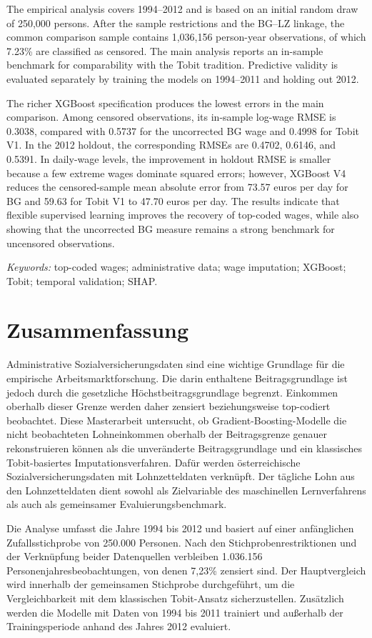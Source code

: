 \documentclass[12pt,a4paper,oneside,titlepage]{book}
\begin{document}
The empirical analysis covers 1994--2012 and is based on an initial random draw of 250,000 persons. After the sample restrictions and the BG--LZ linkage, the common comparison sample contains 1,036,156 person-year observations, of which 7.23\% are classified as censored. The main analysis reports an in-sample benchmark for comparability with the Tobit tradition. Predictive validity is evaluated separately by training the models on 1994--2011 and holding out 2012.

The richer XGBoost specification produces the lowest errors in the main comparison. Among censored observations, its in-sample log-wage RMSE is 0.3038, compared with 0.5737 for the uncorrected BG wage and 0.4998 for Tobit V1. In the 2012 holdout, the corresponding RMSEs are 0.4702, 0.6146, and 0.5391. In daily-wage levels, the improvement in holdout RMSE is smaller because a few extreme wages dominate squared errors; however, XGBoost V4 reduces the censored-sample mean absolute error from 73.57 euros per day for BG and 59.63 for Tobit V1 to 47.70 euros per day. The results indicate that flexible supervised learning improves the recovery of top-coded wages, while also showing that the uncorrected BG measure remains a strong benchmark for uncensored observations.

\textit{Keywords:} top-coded wages; administrative data; wage imputation; XGBoost; Tobit; temporal validation; SHAP.

\chapter*{Zusammenfassung}
Administrative Sozialversicherungsdaten sind eine wichtige Grundlage für die empirische Arbeitsmarktforschung. Die darin enthaltene Beitragsgrundlage ist jedoch durch die gesetzliche Höchstbeitragsgrundlage begrenzt. Einkommen oberhalb dieser Grenze werden daher zensiert beziehungsweise top-codiert beobachtet. Diese Masterarbeit untersucht, ob Gradient-Boosting-Modelle die nicht beobachteten Lohneinkommen oberhalb der Beitragsgrenze genauer rekonstruieren können als die unveränderte Beitragsgrundlage und ein klassisches Tobit-basiertes Imputationsverfahren. Dafür werden österreichische Sozialversicherungsdaten mit Lohnzetteldaten verknüpft. Der tägliche Lohn aus den Lohnzetteldaten dient sowohl als Zielvariable des maschinellen Lernverfahrens als auch als gemeinsamer Evaluierungsbenchmark.

Die Analyse umfasst die Jahre 1994 bis 2012 und basiert auf einer anfänglichen Zufallsstichprobe von 250.000 Personen. Nach den Stichprobenrestriktionen und der Verknüpfung beider Datenquellen verbleiben 1.036.156 Personenjahresbeobachtungen, von denen 7,23\% zensiert sind. Der Hauptvergleich wird innerhalb der gemeinsamen Stichprobe durchgeführt, um die Vergleichbarkeit mit dem klassischen Tobit-Ansatz sicherzustellen. Zusätzlich werden die Modelle mit Daten von 1994 bis 2011 trainiert und außerhalb der Trainingsperiode anhand des Jahres 2012 evaluiert.
\end{document}
